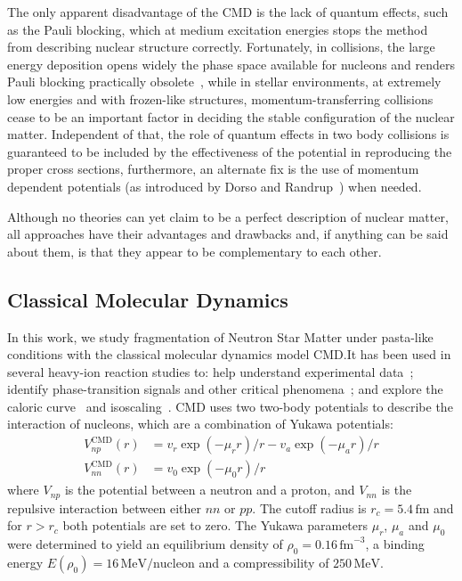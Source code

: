 The only apparent disadvantage of the CMD is the lack of quantum
effects, such as the Pauli blocking, which at medium excitation
energies stops the method from describing nuclear structure
correctly. Fortunately, in collisions, the large energy deposition
opens widely the phase space available for nucleons and renders Pauli
blocking practically obsolete~\cite{lopez_lectures_2000}, while in
stellar environments, at extremely low energies and with frozen-like
structures, momentum-transferring collisions cease to be an important
factor in deciding the stable configuration of the nuclear
matter. Independent of that, the role of quantum effects in two body
collisions is guaranteed to be included by the effectiveness of the
potential in reproducing the proper cross sections, furthermore, an
alternate fix is the use of momentum dependent potentials (as
introduced by Dorso and Randrup~\cite{dorso_classical_1988}) when
needed.

Although no theories can yet claim to be a perfect description of
nuclear matter, all approaches have their advantages and drawbacks
and, if anything can be said about them, is that they appear to be
complementary to each other.


\subsection{Classical Molecular Dynamics}\label{ssc:cmd}
In this work, we study fragmentation of Neutron Star Matter under
pasta-like conditions with the classical molecular dynamics model
CMD.\@ It has been used in several heavy-ion reaction studies to: help
understand experimental data~\cite{chernomoretz_quasiclassical_2002};
identify phase-transition signals and other critical
phenomena~\cite{lopez_lectures_2000, barranon_searching_2001,
  dorso_selection_2001, barranon_critical_2003, barranon_time_2007};
and explore the caloric curve~\cite{barranon_entropy_2004} and
isoscaling~\cite{dorso_dynamical_2006, dorso_isoscaling_2011}. CMD
uses two two-body potentials to describe the interaction of nucleons,
which are a combination of Yukawa potentials:
\begin{align*}
  V^{\text{CMD}}_{np}(r) &=v_{r}\exp(-\mu_{r}r)/{r}-v_{a}\exp(-\mu_{a}r)/{r}\\
  V^{\text{CMD}}_{nn}(r) &=v_{0}\exp(-\mu_{0}r)/{r}
\end{align*}
where $V_{np}$ is the potential between a neutron and a proton, and
$V_{nn}$ is the repulsive interaction between either $nn$ or $pp$. The
cutoff radius is $r_c=5.4\,\text{fm}$ and for $r>r_c$ both potentials
are set to zero. The Yukawa parameters $\mu_r$, $\mu_a$ and $\mu_0$
were determined to yield an equilibrium density of $\rho_0=0.16
\,\text{fm}^{-3}$, a binding energy $E(\rho_0)=16
\,\text{MeV/nucleon}$ and a compressibility of $250\,\text{MeV}$.

